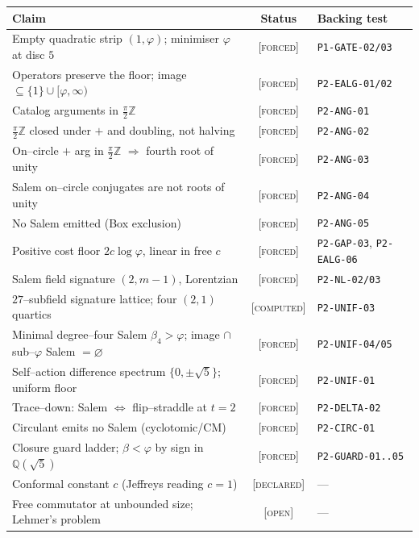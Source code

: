 \documentclass[11pt]{article}
\theoremstyle{plain}
\theoremstyle{definition}
\theoremstyle{remark}
\newcommand{\forced}{\textcolor{forcedc}{\textsc{[forced]}}}
\newcommand{\declared}{\textcolor{declaredc}{\textsc{[declared]}}}
\newcommand{\openq}{\textcolor{openc}{\textsc{[open]}}}
\newcommand{\computed}{\textcolor{forcedc}{\textsc{[computed]}}}
\newcommand{\Q}{\mathbb{Q}}
\newcommand{\Z}{\mathbb{Z}}
\begin{document}
\begin{center}
\renewcommand{\arraystretch}{1.18}
\begin{tabular}{@{}p{6.6cm}cl@{}}
\toprule
\textbf{Claim} & \textbf{Status} & \textbf{Backing test} \\
\midrule
Empty quadratic strip $(1,\varphi)$; minimiser $\varphi$ at disc $5$ & \forced & \texttt{P1-GATE-02/03} \\
Operators preserve the floor; image $\subseteq\{1\}\cup[\varphi,\infty)$ & \forced & \texttt{P2-EALG-01/02} \\
Catalog arguments in $\tfrac\pi2\Z$ & \forced & \texttt{P2-ANG-01} \\
$\tfrac\pi2\Z$ closed under $+$ and doubling, not halving & \forced & \texttt{P2-ANG-02} \\
On--circle $+$ arg in $\tfrac\pi2\Z$ $\Rightarrow$ fourth root of unity & \forced & \texttt{P2-ANG-03} \\
Salem on--circle conjugates are not roots of unity & \forced & \texttt{P2-ANG-04} \\
No Salem emitted (Box exclusion) & \forced & \texttt{P2-ANG-05} \\
Positive cost floor $2c\log\varphi$, linear in free $c$ & \forced & \texttt{P2-GAP-03}, \texttt{P2-EALG-06} \\
Salem field signature $(2,m-1)$, Lorentzian & \forced & \texttt{P2-NL-02/03} \\
$27$--subfield signature lattice; four $(2,1)$ quartics & \computed & \texttt{P2-UNIF-03} \\
Minimal degree--four Salem $\beta_4>\varphi$; image $\cap$ sub--$\varphi$ Salem $=\varnothing$ & \forced & \texttt{P2-UNIF-04/05} \\
Self--action difference spectrum $\{0,\pm\sqrt5\}$; uniform floor & \forced & \texttt{P2-UNIF-01} \\
Trace--down: Salem $\iff$ flip--straddle at $t=2$ & \forced & \texttt{P2-DELTA-02} \\
Circulant emits no Salem (cyclotomic/CM) & \forced & \texttt{P2-CIRC-01} \\
Closure guard ladder; $\beta<\varphi$ by sign in $\Q(\sqrt5)$ & \forced & \texttt{P2-GUARD-01..05} \\
Conformal constant $c$ (Jeffreys reading $c=1$) & \declared & --- \\
Free commutator at unbounded size; Lehmer's problem & \openq & --- \\
\bottomrule
\end{tabular}
\end{center}
\end{document}
